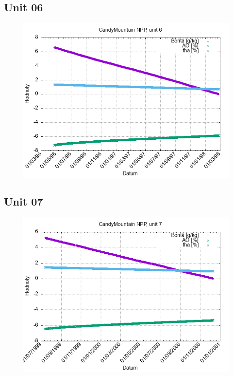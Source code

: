 \documentclass{article}
\begin{document}
\subsection*{Unit 06}
\begin{figure}[h!]
\centering
\includegraphics[width=14cm]{./grafy/CandyMountain06.png}
\end{figure}
\clearpage
\subsection*{Unit 07}
\begin{figure}[h!]
\centering
\includegraphics[width=14cm]{./grafy/CandyMountain07.png}
\end{figure}
\clearpage
\end{document}
